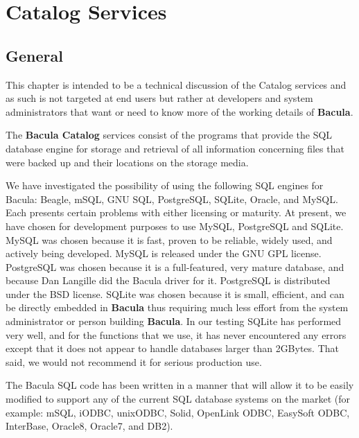 
\chapter{Catalog Services}
\label{_ChapterStart30}

\section{General}

This chapter is intended to be a technical discussion of the Catalog services
and as such is not targeted at end users but rather at developers and system
administrators that want or need to know more of the working details of {\bf
Bacula}.

The {\bf Bacula Catalog} services consist of the programs that provide the SQL
database engine for storage and retrieval of all information concerning files
that were backed up and their locations on the storage media.

We have investigated the possibility of using the following SQL engines for
Bacula: Beagle, mSQL, GNU SQL, PostgreSQL, SQLite, Oracle, and MySQL. Each
presents certain problems with either licensing or maturity. At present, we
have chosen for development purposes to use MySQL, PostgreSQL and SQLite.
MySQL was chosen because it is fast, proven to be reliable, widely used, and
actively being developed. MySQL is released under the GNU GPL license.
PostgreSQL was chosen because it is a full-featured, very mature database, and
because Dan Langille did the Bacula driver for it. PostgreSQL is distributed
under the BSD license. SQLite was chosen because it is small, efficient, and
can be directly embedded in {\bf Bacula} thus requiring much less effort from
the system administrator or person building {\bf Bacula}. In our testing
SQLite has performed very well, and for the functions that we use, it has
never encountered any errors except that it does not appear to handle
databases larger than 2GBytes. That said, we would not recommend it for
serious production use.

The Bacula SQL code has been written in a manner that will allow it to be
easily modified to support any of the current SQL database systems on the
market (for example: mSQL, iODBC, unixODBC, Solid, OpenLink ODBC, EasySoft
ODBC, InterBase, Oracle8, Oracle7, and DB2).

